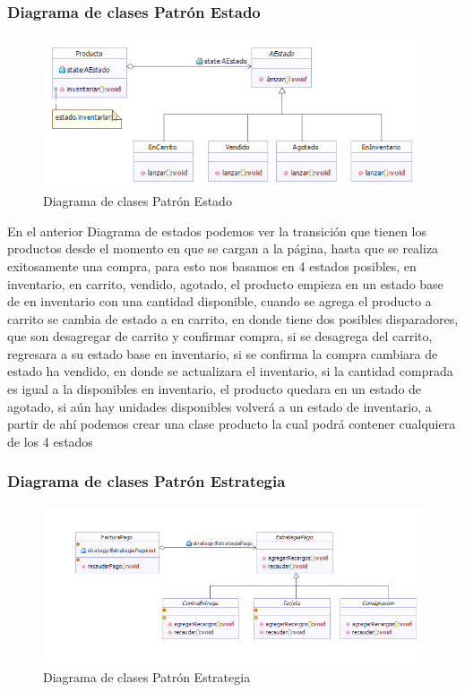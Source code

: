 \subsubsection*{Diagrama de clases Patrón Estado}

\begin{figure}[th!]
	\centering
	\includegraphics[width=0.7\linewidth]{arquitectura/imagenes/PatronEstadoCasoEstudio}
	\caption{Diagrama de clases Patrón Estado}
\end{figure}


En el anterior Diagrama de estados podemos ver la transición que tienen los productos desde el momento en que se cargan a la página, hasta que se realiza exitosamente una  compra, para esto nos basamos en 4 estados posibles, en inventario, en carrito, vendido, agotado, el producto empieza en un estado base de en inventario con una cantidad disponible, cuando se agrega el producto a carrito se cambia de estado a en carrito, en donde tiene dos posibles disparadores, que son desagregar de carrito y confirmar compra, si se desagrega del carrito, regresara a su estado base en inventario, si se confirma la compra cambiara de estado ha vendido, en donde se actualizara el inventario, si la cantidad comprada es igual a la disponibles en inventario, el producto quedara en un estado de agotado, si aún hay unidades disponibles volverá a un estado de inventario, a partir de ahí podemos crear una clase producto la cual podrá contener cualquiera de los 4 estados

\subsubsection*{Diagrama de clases Patrón Estrategia}

\begin{figure}[th!]
	\centering
	\includegraphics[width=1.0\linewidth]{arquitectura/imagenes/DiagramaEstrategia}
	\caption{Diagrama de clases Patrón Estrategia}
	\label{fig:patronEstrategia1}
\end{figure}



